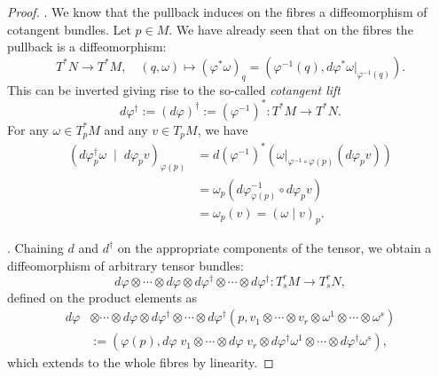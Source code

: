 \begin{proof}
  .
  We know that the pullback induces on the fibres a diffeomorphism of cotangent bundles. Let $p\in M$.
  We have already seen that on the fibres the pullback is a diffeomorphism:
  \begin{equation}
    T^*N \to T^* M, \quad
    (q,\omega) \mapsto (\varphi^*\omega)_q = \left(\varphi^{-1}(q), d\varphi^*\omega|_{\varphi^{-1}(q)}\right).
  \end{equation}
  This can be inverted giving rise to the so-called \emph{cotangent lift}
  \begin{equation}
    d\varphi^\dagger :=(d\varphi)^\dagger := (\varphi^{-1})^*: T^*M \to T^*N.
  \end{equation}
  For any $\omega\in T_p^* M$ and any $v\in T_pM$, we have
  \begin{align}
    (d\varphi^\dagger_p \omega \;\mid\; d\varphi_p v)_{\varphi(p)} & =  d(\varphi^{-1})^*(\omega|_{\varphi^{-1}\circ\varphi(p)} (d\varphi_p v) ) \\
                                                                   & = \omega_p(d\varphi^{-1}_{\varphi(p)} \circ d\varphi_p v )                  \\
                                                                   & = \omega_p(v) = (\omega \mid v)_p.
  \end{align}

  .
  Chaining $d$ and $d^\dagger$ on the appropriate components of the tensor, we obtain a diffeomorphism of arbitrary tensor bundles:
  \begin{equation}
    d\varphi \otimes\cdots\otimes d\varphi \otimes d\varphi^\dagger \otimes\cdots\otimes d\varphi^\dagger  : T_s^rM \to T_s^r N,
  \end{equation}
  defined on the product elements as
  \begin{align}
    d\varphi & \otimes\cdots\otimes d\varphi \otimes d\varphi^\dagger \otimes\cdots\otimes d\varphi^\dagger  (p, v_1 \otimes \cdots\otimes v_r \otimes \omega^1\otimes\cdots\otimes\omega^s) \\
             & := (\varphi(p), d\varphi\; v_1 \otimes \cdots\otimes d\varphi\; v_r \otimes d\varphi^\dagger \omega^1\otimes\cdots\otimes d\varphi^\dagger \omega^s),
  \end{align}
  which extends to the whole fibres by linearity.
\end{proof}

